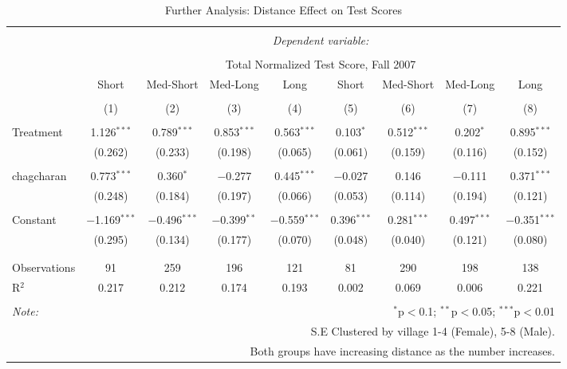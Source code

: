 \documentclass[
]{article}
\begin{document}
\begin{table}[!htbp] \centering 
  \caption{Further Analysis: Distance Effect on Test Scores} 
  \label{} 
\begin{tabular}{@{\extracolsep{-10pt}}lcccccccc} 
\\[-1.8ex]\hline 
\hline \\[-1.8ex] 
 & \multicolumn{8}{c}{\textit{Dependent variable:}} \\ 
\cline{2-9} 
\\[-1.8ex] & \multicolumn{8}{c}{Total Normalized Test Score, Fall 2007} \\ 
 & Short & Med-Short & Med-Long & Long & Short & Med-Short & Med-Long & Long \\ 
\\[-1.8ex] & (1) & (2) & (3) & (4) & (5) & (6) & (7) & (8)\\ 
\hline \\[-1.8ex] 
 Treatment & 1.126$^{***}$ & 0.789$^{***}$ & 0.853$^{***}$ & 0.563$^{***}$ & 0.103$^{*}$ & 0.512$^{***}$ & 0.202$^{*}$ & 0.895$^{***}$ \\ 
  & (0.262) & (0.233) & (0.198) & (0.065) & (0.061) & (0.159) & (0.116) & (0.152) \\ 
  & & & & & & & & \\ 
 chagcharan & 0.773$^{***}$ & 0.360$^{*}$ & $-$0.277 & 0.445$^{***}$ & $-$0.027 & 0.146 & $-$0.111 & 0.371$^{***}$ \\ 
  & (0.248) & (0.184) & (0.197) & (0.066) & (0.053) & (0.114) & (0.194) & (0.121) \\ 
  & & & & & & & & \\ 
 Constant & $-$1.169$^{***}$ & $-$0.496$^{***}$ & $-$0.399$^{**}$ & $-$0.559$^{***}$ & 0.396$^{***}$ & 0.281$^{***}$ & 0.497$^{***}$ & $-$0.351$^{***}$ \\ 
  & (0.295) & (0.134) & (0.177) & (0.070) & (0.048) & (0.040) & (0.121) & (0.080) \\ 
  & & & & & & & & \\ 
\hline \\[-1.8ex] 
Observations & 91 & 259 & 196 & 121 & 81 & 290 & 198 & 138 \\ 
R$^{2}$ & 0.217 & 0.212 & 0.174 & 0.193 & 0.002 & 0.069 & 0.006 & 0.221 \\ 
\hline 
\hline \\[-1.8ex] 
\textit{Note:}  & \multicolumn{8}{r}{$^{*}$p$<$0.1; $^{**}$p$<$0.05; $^{***}$p$<$0.01} \\ 
 & \multicolumn{8}{r}{S.E Clustered by village 1-4 (Female), 5-8 (Male).} \\ 
 & \multicolumn{8}{r}{Both groups have increasing distance as the number increases.} \\ 
\end{tabular} 
\end{table}
\end{document}
